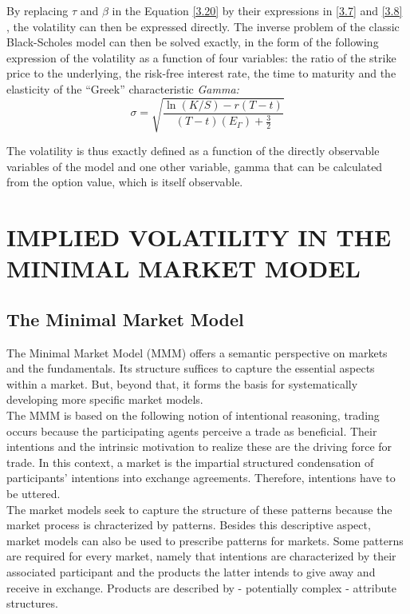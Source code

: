 \documentclass[a4 paper, 12pt]{report}
\theoremstyle{plain}
\begin{document}
By replacing $\tau$ and $\beta$ in the Equation \eqref{3.20} by their expressions in \eqref{3.7} and \eqref{3.8} , the volatility can then be expressed directly. The inverse problem of the classic Black-Scholes model can then be solved exactly, in the form of the following expression of the volatility as a function of four variables: the ratio of the strike price to the underlying, the risk-free interest rate, the time to maturity and the elasticity of the ``Greek'' characteristic \emph{Gamma:}
\begin{equation}\label{3.22}
\sigma = \sqrt{\frac{\ln(K/S) - r(T-t)}{(T-t)(E_\Gamma)+\frac{3}{2}}}
\end{equation}

The volatility is thus exactly defined as a function of the directly observable variables of the model and one other variable, gamma that can be calculated from the option value, which is itself observable.

\chapter{IMPLIED VOLATILITY IN THE MINIMAL MARKET MODEL}
\section{The Minimal Market Model}
\noindent
\par The Minimal Market Model (MMM) offers a semantic perspective on markets and the fundamentals. Its structure suffices to capture the essential aspects within a market. But, beyond that, it forms the basis for systematically developing more specific market models.\\

The MMM is based on the following notion of intentional reasoning, trading occurs because the participating agents perceive a trade as beneficial. Their intentions and the intrinsic motivation to realize these are the driving force for trade. In this context, a market is the impartial structured condensation of participants' intentions into exchange agreements. Therefore, intentions have to be uttered.\\

The market models seek to capture the structure of these patterns because the market process is chracterized by patterns.%
Besides this descriptive aspect, market models can also be used to prescribe patterns for markets. Some patterns are required for every market, namely that intentions are characterized by their associated participant and the products the latter intends to give away and receive in exchange. Products are described by - potentially complex - attribute structures.\\
\end{document}
